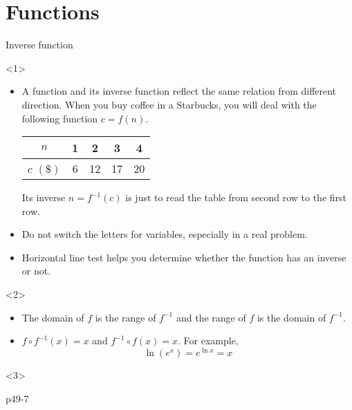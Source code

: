 \section{Functions}
\begin{frame}{Inverse function}

\begin{onlyenv}<1>

\begin{itemize}
\item A function and its inverse function reflect the same relation from
different direction. When you buy coffee in a Starbucks, you will
deal with the following function $c=f\left(n\right)$.


\begin{center}
\begin{tabular}{|c|c|c|c|c|}
\hline 
$n$ & 1 & 2 & 3 & 4\tabularnewline
\hline 
$c$ $\left(\$\right)$ & 6 & 12 & 17 & 20\tabularnewline
\hline 
\end{tabular}
\par\end{center}


Its inverse $n=f^{-1}\left(c\right)$ is just to read the table from
second row to the first row.

\item Do not switch the letters for variables, especially in a real problem.
\item \alert{Horizontal line test} helps you determine whether the function
has an inverse or not.
\end{itemize}
\end{onlyenv}



\begin{onlyenv}<2>

\begin{itemize}
\item The domain of $f$ is the range of $f^{-1}$ and the range of $f$
is the domain of $f^{-1}$.
\item $f\circ f^{-1}\left(x\right)=x$ and $f^{-1}\circ f\left(x\right)=x$.
For example,
\[
\ln\left(e^{x}\right)=e^{\ln x}=x
\]

\end{itemize}
\end{onlyenv}



\begin{onlyenv}<3>

\begin{example}
p49-7
\end{example}

\end{onlyenv}

\end{frame}

